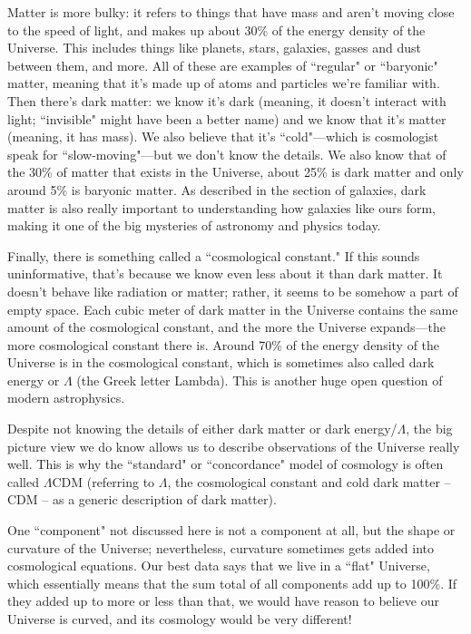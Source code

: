 Matter is more bulky: it refers to things that have mass and aren't moving close to the speed of light, and makes up about 30\% of the energy density of the Universe. This includes things like planets, stars, galaxies, gasses and dust between them, and more. All of these are examples of ``regular" or ``baryonic" matter, meaning that it's made up of atoms and particles we're familiar with. Then there's dark matter: we know it's dark (meaning, it doesn't interact with light; ``invisible" might have been a better name) and we know that it's matter (meaning, it has mass). We also believe that it's ``cold"---which is cosmologist speak for ``slow-moving"---but we don't know the details. We also know that of the 30\% of matter that exists in the Universe, about 25\% is dark matter and only around 5\% is baryonic matter. As described in the section of galaxies, dark matter is also really important to understanding how galaxies like ours form, making it one of the big mysteries of astronomy and physics today. 

Finally, there is something called a ``cosmological constant." If this sounds uninformative, that's because we know even less about it than dark matter. It doesn't behave like radiation or matter; rather, it seems to be somehow a part of empty space. Each cubic meter of dark matter in the Universe contains the same amount of the cosmological constant, and the more the Universe expands---the more cosmological constant there is. Around 70\% of the energy density of the Universe is in the cosmological constant, which is sometimes also called dark energy or $\Lambda$ (the Greek letter Lambda). This is another huge open question of modern astrophysics. 

Despite not knowing the details of either dark matter or dark energy/$\Lambda$, the big picture view we do know allows us to describe observations of the Universe really well. This is why the ``standard" or ``concordance" model of cosmology is often called $\Lambda$CDM (referring to $\Lambda$, the cosmological constant and cold dark matter -- CDM -- as a generic description of dark matter).   

One ``component" not discussed here is not a component at all, but the shape or curvature of the Universe; nevertheless, curvature sometimes gets added into cosmological equations. Our best data says that we live in a ``flat" Universe, which essentially means that the sum total of all components add up to 100\%. If they added up to more or less than that, we would have reason to believe our Universe is curved, and its cosmology would be very different!

